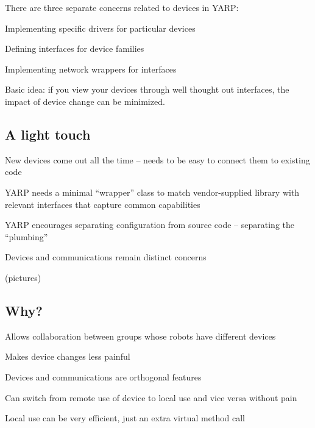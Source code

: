 There are three separate concerns related to devices in YARP:

Implementing specific drivers for particular devices 

Defining interfaces for device families 

Implementing network wrappers for interfaces

Basic idea: if you view your devices through well thought out
interfaces, the impact of device change can be minimized.


\subsection{A light touch}

New devices come out all the time -- needs to be easy to connect them
to existing code

YARP needs a minimal ``wrapper'' class to match vendor-supplied
library with relevant interfaces that capture common capabilities

YARP encourages separating configuration from source code -- separating
the ``plumbing''

Devices and communications remain distinct concerns

(pictures)


\subsection{Why?}

Allows collaboration between groups whose robots have different devices

Makes device changes less painful

Devices and communications are orthogonal features

Can switch from remote use of device to local use and vice versa without pain

Local use can be very efficient, just an extra virtual method call

